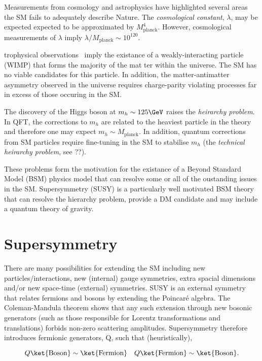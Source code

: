 Measurements from cosmology and astrophysics have highlighted several areas
the SM fails to adequately describe Nature. The \emph{cosmological constant}, $\lambda$,
may be expected expected to be approximated by $M^4_{\text{planck}}$. However,
cosmological measurements of $\lambda$ imply $\lambda/M_{\text{planck}} \sim 10^{120}$.

trophysical observations~\cite{} imply the existance 
of a weakly-interacting particle (WIMP) that forms the majority of the mat
ter within the universe. The SM has no viable candidates for 
this particle. In addition, the matter-antimatter asymmetry observed in the universe requires 
charge-parity violating processes far in excess of those occuring in the SM.

The discovery of the Higgs boson at $m_{h}\sim125\GeV$ raises the \emph{heirarchy problem}. In QFT, 
the corrections to $m_h$ are related to the heaviest particle in the theory and therefore
one may expect $m_h \sim M_{\text{planck}}$. In addition, quantum corrections from SM particles
require fine-tuning in the SM to stabilise $m_h$ (the \emph{technical heirarchy problem}, see ??).

These problems form the motivation for the existance of a Beyond Standard Model (BSM) physics model that
can resolve some or all of the oustanding issues in the SM. Supersymmetry (SUSY) is a particularly
well motivated BSM theory that can resolve the hierarchy problem, provide a DM candidate
and may include a quantum theory of gravity.

\section{Supersymmetry}

There are many possibilities for extending the SM including new particles/interactions, new (internal) gauge symmetries, 
extra spacial dimensions and/or new space-time (external) symmetries. SUSY is 
an external symmetry that relates fermions and bosons by extending the Poincar\'{e} algebra. The Coleman-Mandula theorem shows that any
such extension through new bosonic generators (such as those responsible for Lorentz 
transformations and translations) forbids non-zero scattering amplitudes. 
Supersymmetry therefore introduces fermionic generators, Q, such that (heuristically),

\begin{equation}
Q\ket{\text{Boson}} \sim \ket{\text{Fermion}} \quad Q\ket{\text{Fermion}} \sim \ket{\text{Boson}}.
\end{equation}

